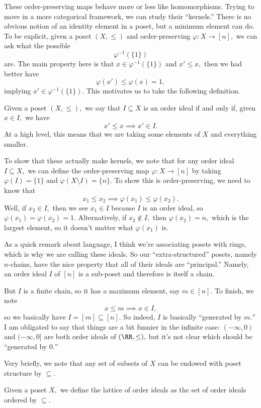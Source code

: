 These order-preserving maps behave more or less like homomorphisms. Trying to move in a more categorical framework, we can study their ``kernels.'' There is no obvious notion of an identity element in a poset, but a minimum element can do. To be explicit, given a poset $(X,\le)$ and order-preserving $\varphi:X\to[n],$ we can ask what the possible
\[\varphi^{-1}(\{1\})\]
are. The main property here is that $x\in\varphi^{-1}(\{1\})$ and $x'\le x,$ then we had better have
\[\varphi(x')\le\varphi(x)=1,\]
implying $x'\in\varphi^{-1}(\{1\}).$ This motivates us to take the following definition.
\begin{definition}
    Given a poset $(X,\le),$ we say that $I\subseteq X$ is an order ideal if and only if, given $x\in I,$ we have
    \[x'\le x\implies x'\in I.\]
    At a high level, this means that we are taking some elements of $X$ and everything smaller.
\end{definition}
To show that these actually make kernels, we note that for any order ideal $I\subseteq X,$ we can define the order-preserving map $\varphi:X\to[n]$ by taking $\varphi(I)=\{1\}$ and $\varphi(X\setminus I)=\{n\}.$ To show this is order-preserving, we need to know that
\[x_1\le x_2\implies\varphi(x_1)\le\varphi(x_2).\]
Well, if $x_2\in I,$ then we see $x_1\in I$ because $I$ is an order ideal, so $\varphi(x_1)=\varphi(x_2)=1.$ Alternatively, if $x_2\notin I,$ then $\varphi(x_2)=n,$ which is the largest element, so it doesn't matter what $\varphi(x_1)$ is.

As a quick remark about language, I think we're associating posets with rings, which is why we are calling these ideals. So our ``extra-structured'' posets, namely $n$-chains, have the nice property that all of their ideals are ``principal.'' Namely, an order ideal $I$ of $[n]$ is a sub-poset and therefore is itself a chain.

But $I$ is a finite chain, so it has a maximum element, say $m\in[n].$ To finish, we note
\[x\le m\implies x\in I,\]
so we basically have $I=[m]\subseteq[n].$ So indeed, $I$ is basically ``generated by $m.$'' I am obligated to say that things are a bit funnier in the infinite case: $(-\infty,0)$ and $(-\infty,0]$ are both order ideals of $(\RR,\le),$ but it's not clear which should be ``generated by $0.$''

Very briefly, we note that any set of subsets of $X$ can be endowed with poset structure by $\subseteq.$
\begin{definition}
    Given a poset $X,$ we define the lattice of order ideals as the set of order ideals ordered by $\subseteq.$
\end{definition}


